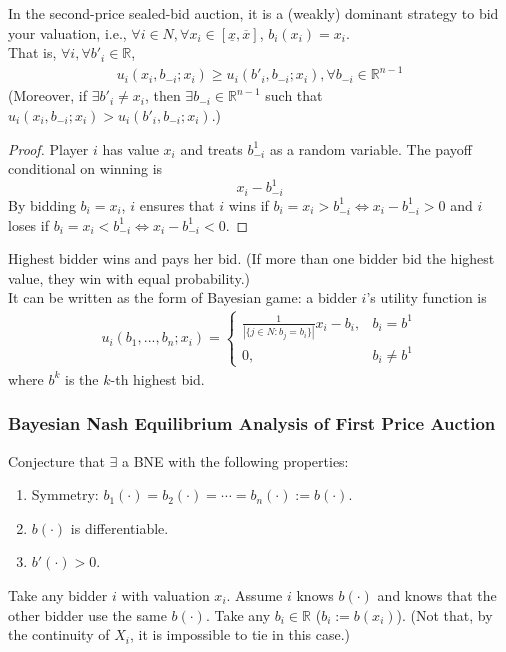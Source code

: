 \documentclass[11pt]{elegantbook}
\begin{document}
\begin{theorem}
    In the second-price sealed-bid auction, it is a (weakly) dominant strategy to bid your valuation, i.e., $\forall i\in N,\forall x_i\in[\underline{x},\overline{x}]$, $b_i(x_i)=x_i$.\\
    That is, $\forall i, \forall b'_i\in \mathbb{R}$,
    \begin{equation}
        \begin{aligned}
            u_i(x_i,b_{-i};x_i)\geq u_i(b'_i,b_{-i};x_i), \forall b_{-i}\in \mathbb{R}^{n-1}
        \end{aligned}
        \nonumber
    \end{equation}
    (Moreover, if $\exists b'_{i}\neq x_i$, then $\exists b_{-i}\in \mathbb{R}^{n-1}$ such that $u_i(x_i,b_{-i};x_i)> u_i(b'_{i},b_{-i};x_i)$.)
\end{theorem}
\begin{proof}
    Player $i$ has value $x_i$ and treats $b^1_{-i}$ as a random variable. The payoff conditional on winning is $$x_i-b^1_{-i}$$ By bidding $b_i=x_i$, $i$ ensures that $i$ wins if $b_i=x_i>b^1_{-i}\Leftrightarrow x_i-b^1_{-i}>0$ and $i$ loses if $b_i=x_i<b^1_{-i}\Leftrightarrow x_i-b^1_{-i}<0$.
\end{proof}

\begin{definition}
    \normalfont
    Highest bidder wins and pays her bid. (If more than one bidder bid the highest value, they win with equal probability.)\\
    It can be written as the form of Bayesian game: a bidder $i$'s utility function is
    \begin{equation}
        \begin{aligned}
            u_i(b_1,...,b_n;x_i)=\left\{\begin{matrix}
                \frac{1}{|\{j\in N:b_j=b_i\}|}x_i-b_i,&b_i=b^1\\
                0,&b_i\neq b^1
            \end{matrix}\right.
        \end{aligned}
        \nonumber
    \end{equation}
    where $b^k$ is the $k$-th highest bid.
\end{definition}


\subsubsection*{Bayesian Nash Equilibrium Analysis of First Price Auction}
Conjecture that $\exists$ a BNE with the following properties:
\begin{enumerate}
    \item Symmetry: $b_1(\cdot)=b_2(\cdot)=\cdots=b_n(\cdot):=b(\cdot)$.
    \item $b(\cdot)$ is differentiable.
    \item $b'(\cdot)>0$.
\end{enumerate}
Take any bidder $i$ with valuation $x_i$. Assume $i$ knows $b(\cdot)$ and knows that the other bidder use the same $b(\cdot)$. Take any $b_i\in \mathbb{R}$ ($b_i:=b(x_i)$). (Not that, by the continuity of $X_i$, it is impossible to tie in this case.)
\end{document}
